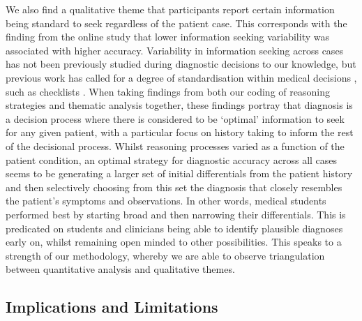 \documentclass[a4paper, nobind]{templates/ociamthesis}
\begin{document}
We also find a qualitative theme that participants report certain information being standard to seek regardless of the patient case. This corresponds with the finding from the online study that lower information seeking variability was associated with higher accuracy. Variability in information seeking across cases has not been previously studied during diagnostic decisions to our knowledge, but previous work has called for a degree of standardisation within medical decisions \autocite{wears_standardisation_2015}, such as checklists \autocite{ely_checklists_2011}. When taking findings from both our coding of reasoning strategies and thematic analysis together, these findings portray that diagnosis is a decision process where there is considered to be `optimal' information to seek for any given patient, with a particular focus on history taking to inform the rest of the decisional process. Whilst reasoning processes varied as a function of the patient condition, an optimal strategy for diagnostic accuracy across all cases seems to be generating a larger set of initial differentials from the patient history and then selectively choosing from this set the diagnosis that closely resembles the patient's symptoms and observations. In other words, medical students performed best by starting broad and then narrowing their differentials. This is predicated on students and clinicians being able to identify plausible diagnoses early on, whilst remaining open minded to other possibilities. This speaks to a strength of our methodology, whereby we are able to observe triangulation between quantitative analysis and qualitative themes.

\subsection{Implications and Limitations}\label{implications-and-limitations}
\end{document}
